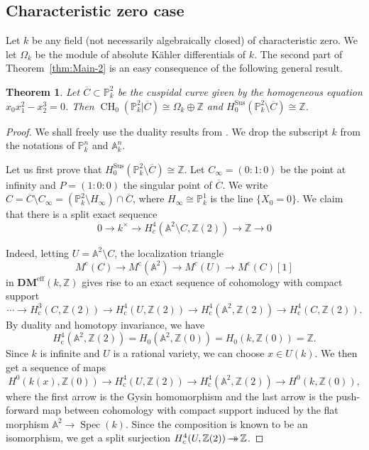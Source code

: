 \documentclass[JEP,XML,SOM,Unicode,published]{cedram}
\newcommand{\onto}{\mathchoice{\to\hspace*{-5mm}\to}{\hspace*{-.5mm}\to\hspace*{-2.85mm}\to\hspace*{-.5mm}}{\to\hspace*{-3mm}\to}{\to\hspace*{-3mm}\to}}
\let\surj\onto
\newcommand{\rc}{\mathrm{c}}
\newcommand{\sus}{\mathrm{Sus}}
\newtheorem{thm}{Theorem}[section]
\theoremstyle{definition}
\newcommand{\thmref}{Theorem~\ref}
\newcommand{\A}{{\mathbb A}}
\renewcommand{\P}{{\mathbb P}}
\newcommand{\Z}{{\mathbb Z}}
\DeclareMathOperator{\CH}{CH}
\DeclareMathOperator{\Spec}{Spec}
\newcommand{\eff}{\mathrm{eff}}
\let\ov\overline
\let\ol\ov
\begin{document}
\subsection{Characteristic zero case}\label{sec:Char-0}
Let $k$ be any field (not necessarily algebraically closed) of characteristic zero.
We let $\Omega_k$ be the module of absolute Kähler differentials of $k$.
The second part of \thmref{thm:Main-2} is an easy consequence of the following
general result.

\begin{thm}\label{thm:Failure}
Let $\ol{C} \subset \P^2_k$ be
the cuspidal curve given by the homogeneous equation
$x_0x^2_1-x^3_2 = 0$. Then $\CH_0(\P^2_k|\ol{C}) \cong \Omega_k \oplus \Z$ and
$H^{\sus}_0(\P^2_k \setminus \ol{C}) \cong \Z$.
\end{thm}
\begin{proof}
We shall freely use the duality results from \cite{VoevTriangCat}.
We drop the subscript $k$ from the notations of $\P^n_k$ and $\A^n_k$.

Let us first prove that $H^{\sus}_0(\P^2_k\setminus \ol{C}) \cong \Z$. Let
$C_\infty = (0:1:0)$ be the point at infinity and $P = (1:0:0)$ the singular
point of $\ol{C}$. We write
$C = \ol{C} \setminus C_\infty = (\P^2_k \setminus H_\infty) \cap \ov{C}$, where
$H_\infty \cong \P^1_k$ is the line $\{X_0 =0\}$.
We claim that there is a split exact sequence
\begin{equation}\label{eqn:RussellChow}
0\to k^\times \to H_{c }^4(\A^2 \setminus C, \Z(2)) \to \Z\to 0
\end{equation}

Indeed, letting $U = \A^2\setminus C$, the localization triangle
\[M^\rc(C) \to M^\rc(\A^2)\to M^\rc(U)\to M^\rc(C)[1]\]
in ${\mathbf{DM}}^{\eff}(k, \Z)$ gives rise to
an exact sequence of cohomology with compact support
\begin{equation}\label{eq:computehom}
\cdots \to H_{\rc}^3(C, \Z(2)) \to H_{\rc}^4(U, \Z(2)) \to H_{\rc}^4(\A^2, \Z(2)) \to
H_{\rc}^4(C, \Z(2)).
\end{equation}
By duality and homotopy invariance, we have
\[
H_{\rc}^4(\A^2, \Z(2)) =
H_0(\A^2, \Z(0)) = H_0(k, \Z(0)) =\Z.
\]
Since $k$ is infinite and $U$ is a rational variety, we can choose
$x \in U(k)$. We then get a sequence of maps
\[
H^0(k(x), \Z(0)) \to H_{\rc}^4(U, \Z(2)) \to H_{\rc}^4(\A^2, \Z(2)) \to
H^0(k, \Z(0)),
\]
where the first arrow is the Gysin homomorphism and the last arrow is the
push-forward map between cohomology with compact support induced by the
flat morphism $\A^2 \to \Spec(k)$. Since the composition is known to be
an isomorphism, we get a split surjection $H_{c }^4(U, \Z(2)) \surj \Z$.


\end{proof}
\end{document}
